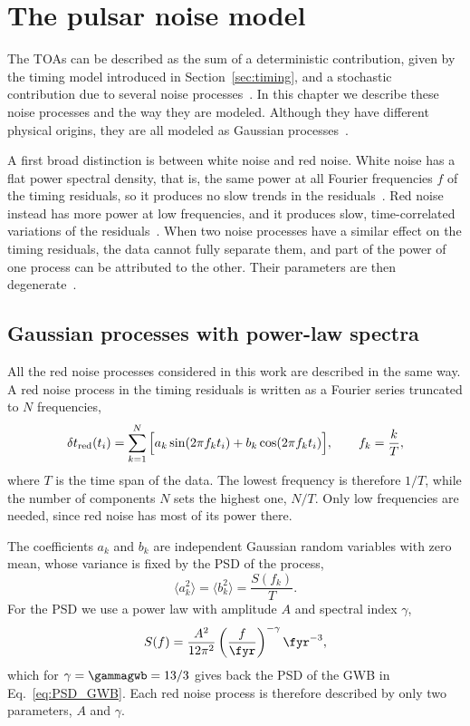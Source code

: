 \chapter{The pulsar noise model} \label{chpt:rumore}

The TOAs can be described as the sum of a deterministic contribution, given by
the timing model introduced in Section~\ref{sec:timing}, and a stochastic
contribution due to several noise processes~\cite{Lentati2016,Shaifullah2025}.
In this chapter we describe these noise processes and the way they are modeled.
Although they have different physical origins, they are all modeled as
Gaussian processes~\cite{Lentati2016}.

A first broad distinction is between white noise and red noise. White noise
has a flat power spectral density, that is, the same power at all Fourier
frequencies $f$ of the timing residuals, so it produces no slow trends in the
residuals~\cite{Taylor2021}. Red noise instead has more power at low
frequencies, and it produces slow, time-correlated variations of the
residuals~\cite{Lentati2016,Taylor2021}. When two noise processes have a
similar effect on the timing residuals, the data cannot fully separate them,
and part of the power of one process can be attributed to the other. Their
parameters are then degenerate~\cite{Shaifullah2025,Ferranti2025}.

\section{Gaussian processes with power-law spectra} \label{sec:modello_comune}

All the red noise processes considered in this work are described in the same
way. A red noise process in the timing residuals is written as a Fourier series
truncated to $N$ frequencies,
\begin{equation}
    \delta t_{\rm red}(t_i) = \sum_{k=1}^{N} \Big[ a_k \sin(2\pi f_k t_i)
    + b_k \cos(2\pi f_k t_i) \Big],
    \qquad f_k = \frac{k}{T},
    \label{eq:fourier}
\end{equation}
where $T$ is the time span of the data. The lowest frequency is therefore
$1/T$, while the number of components $N$ sets the highest one, $N/T$. Only
low frequencies are needed, since red noise has most of its power there.

The coefficients $a_k$ and $b_k$ are independent Gaussian random variables
with zero mean, whose variance is fixed by the PSD of the process,
\begin{equation}
    \langle a_k^2 \rangle = \langle b_k^2 \rangle = \frac{S(f_k)}{T}.
    \label{eq:varianza_coeff}
\end{equation}
For the PSD we use a power law with amplitude $A$ and spectral index $\gamma$,
\begin{equation}
    S(f) = \frac{A^2}{12\pi^2}\left(\frac{f}{\fyr}\right)^{-\gamma}\fyr^{-3},
    \label{eq:PSD_powerlaw}
\end{equation}
which for $\gamma = \gammagwb = 13/3$ gives back the PSD of the GWB in
Eq.~\eqref{eq:PSD_GWB}. Each red noise process is therefore described by only
two parameters, $A$ and $\gamma$.

